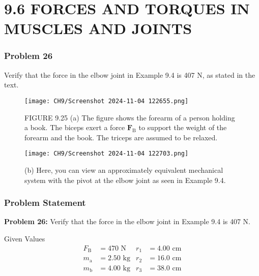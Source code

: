 \documentclass{beamer}
\begin{document}
\section{9.6 FORCES AND TORQUES IN MUSCLES AND JOINTS}

\begin{frame}
\frametitle{Problem 26}
Verify that the force in the elbow joint in Example 9.4 is 407 N, as stated in the text.
\begin{figure}
    \centering
    \texttt{[image: CH9/Screenshot 2024-11-04 122655.png]}
    \caption{FIGURE 9.25 (a) The figure shows the forearm of a person holding a book. The biceps exert a force $\mathbf{F}_{\mathrm{B}}$ to support the weight of the forearm and the book. The triceps are assumed to be relaxed.}
\end{figure}
\end{frame}

\begin{frame}
\begin{figure}
    \centering
    \texttt{[image: CH9/Screenshot 2024-11-04 122703.png]}
    \caption{ (b) Here, you can view an approximately equivalent mechanical system with the pivot at the elbow joint as seen in Example 9.4.}
\end{figure}
\end{frame}

\begin{frame}
\frametitle{Problem Statement}
\textbf{Problem 26:} Verify that the force in the elbow joint in Example 9.4 is 407 N.

\begin{block}{Given Values}
\begin{align*}
F_{\text{B}} &= 470 \text{ N} & r_1 &= 4.00 \text{ cm} \\
m_{\text{a}} &= 2.50 \text{ kg} & r_2 &= 16.0 \text{ cm} \\
m_{\text{b}} &= 4.00 \text{ kg} & r_3 &= 38.0 \text{ cm}
\end{align*}
\end{block}
\end{frame}
\end{document}
